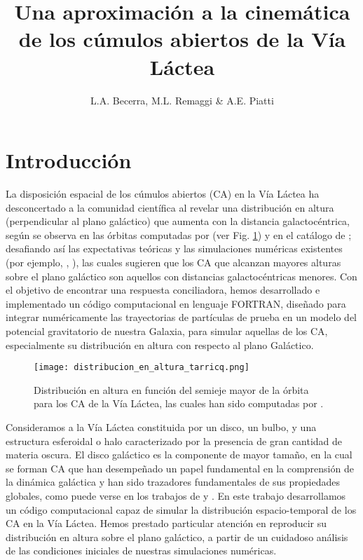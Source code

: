 \documentclass[baaa]{baaa}
\title{Una aproximación a la cinemática de los cúmulos abiertos de la Vía Láctea}
\author{
L.A. Becerra\inst{1},
M.L. Remaggi\inst{1,2}
\&
A.E. Piatti\inst{1,2}
}
\institute{
Facultad de Ciencias Exactas y Naturales, UNCuyo, Argentina \and   
Instituto Interdisciplinario de Ciencias B\'asicas, CONICET--UNCuyo, Argentina
}
\begin{document}
\maketitle
\section{Introducción} \label{Intro}

La disposición espacial de los cúmulos abiertos (CA) en la Vía Láctea ha desconcertado a la comunidad científica al revelar una distribución en altura (perpendicular al plano galáctico) que aumenta con la distancia galactocéntrica, según se observa en las órbitas computadas por \cite{Tarricq} (ver Fig. \ref{fig:tarricq})  y en el catálogo de \cite{Dias}; desafiando así las expectativas teóricas y las simulaciones numéricas existentes (por ejemplo, \citeauthor{Martinez-Medina}, \citeyear{Martinez-Medina}), las cuales sugieren que los CA que alcanzan mayores alturas sobre el plano galáctico son aquellos con distancias galactocéntricas menores. Con el objetivo de encontrar una respuesta conciliadora, hemos desarrollado e implementado un código computacional en lenguaje FORTRAN, diseñado para integrar numéricamente las trayectorias de partículas de prueba en un modelo del potencial gravitatorio de nuestra Galaxia, para simular aquellas de los CA, especialmente su distribución en altura con respecto al plano Galáctico.

\begin{figure}[h]
    \centering
    \texttt{[image: distribucion\_en\_altura\_tarricq.png]}
    \caption{Distribución en altura en función del semieje mayor de la órbita para los CA de la Vía Láctea, las cuales han sido computadas por \cite{Tarricq}.}
    \label{fig:tarricq}
\end{figure}

Consideramos a la Vía Láctea constituida por un disco, un bulbo, y una estructura esferoidal o halo caracterizado por la presencia de gran cantidad de materia oscura. El disco galáctico es la componente de mayor tamaño, en la cual se forman CA que han desempeñado un papel fundamental en la comprensión de la dinámica galáctica y han sido trazadores fundamentales de sus propiedades globales, como puede verse en los trabajos de \cite{Monteiro} y \cite{cantat}. En este trabajo desarrollamos un código computacional capaz de simular la distribución espacio-temporal de los CA en la Vía Láctea. Hemos prestado particular atención en reproducir su distribución en altura sobre el plano galáctico, a partir de un cuidadoso análisis de las condiciones iniciales de nuestras simulaciones numéricas.
\end{document}
